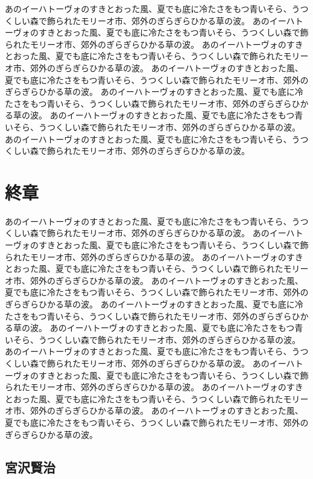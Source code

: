 \documentclass[b5j,12pt]{ltjsbook}
\begin{document}
あのイーハトーヴォのすきとおった風、夏でも底に冷たさをもつ青いそら、うつくしい森で飾られたモリーオ市、郊外のぎらぎらひかる草の波。
あのイーハトーヴォのすきとおった風、夏でも底に冷たさをもつ青いそら、うつくしい森で飾られたモリーオ市、郊外のぎらぎらひかる草の波。
あのイーハトーヴォのすきとおった風、夏でも底に冷たさをもつ青いそら、うつくしい森で飾られたモリーオ市、郊外のぎらぎらひかる草の波。
あのイーハトーヴォのすきとおった風、夏でも底に冷たさをもつ青いそら、うつくしい森で飾られたモリーオ市、郊外のぎらぎらひかる草の波。
あのイーハトーヴォのすきとおった風、夏でも底に冷たさをもつ青いそら、うつくしい森で飾られたモリーオ市、郊外のぎらぎらひかる草の波。
あのイーハトーヴォのすきとおった風、夏でも底に冷たさをもつ青いそら、うつくしい森で飾られたモリーオ市、郊外のぎらぎらひかる草の波。
あのイーハトーヴォのすきとおった風、夏でも底に冷たさをもつ青いそら、うつくしい森で飾られたモリーオ市、郊外のぎらぎらひかる草の波。

\chapter{終章}

あのイーハトーヴォのすきとおった風、夏でも底に冷たさをもつ青いそら、うつくしい森で飾られたモリーオ市、郊外のぎらぎらひかる草の波。
あのイーハトーヴォのすきとおった風、夏でも底に冷たさをもつ青いそら、うつくしい森で飾られたモリーオ市、郊外のぎらぎらひかる草の波。
あのイーハトーヴォのすきとおった風、夏でも底に冷たさをもつ青いそら、うつくしい森で飾られたモリーオ市、郊外のぎらぎらひかる草の波。
あのイーハトーヴォのすきとおった風、夏でも底に冷たさをもつ青いそら、うつくしい森で飾られたモリーオ市、郊外のぎらぎらひかる草の波。
あのイーハトーヴォのすきとおった風、夏でも底に冷たさをもつ青いそら、うつくしい森で飾られたモリーオ市、郊外のぎらぎらひかる草の波。
あのイーハトーヴォのすきとおった風、夏でも底に冷たさをもつ青いそら、うつくしい森で飾られたモリーオ市、郊外のぎらぎらひかる草の波。
あのイーハトーヴォのすきとおった風、夏でも底に冷たさをもつ青いそら、うつくしい森で飾られたモリーオ市、郊外のぎらぎらひかる草の波。
あのイーハトーヴォのすきとおった風、夏でも底に冷たさをもつ青いそら、うつくしい森で飾られたモリーオ市、郊外のぎらぎらひかる草の波。
あのイーハトーヴォのすきとおった風、夏でも底に冷たさをもつ青いそら、うつくしい森で飾られたモリーオ市、郊外のぎらぎらひかる草の波。
あのイーハトーヴォのすきとおった風、夏でも底に冷たさをもつ青いそら、うつくしい森で飾られたモリーオ市、郊外のぎらぎらひかる草の波。

\section{宮沢賢治}
\end{document}
